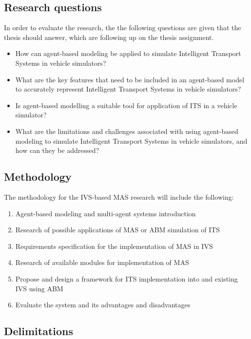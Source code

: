 \documentclass[titlepage, 12pt]{article}
\begin{document}
\subsection{Research questions}

In order to evaluate the research, the the following questions are given that 
the thesis should answer, which are following up on the thesis assignment. 

\begin{itemize}
    \item How can agent-based modeling be applied to simulate Intelligent Transport Systems in vehicle simulators?
    \item What are the key features that need to be included in an agent-based model to accurately represent Intelligent Transport Systems in vehicle simulators?
    \item Is agent-based modelling a suitable tool for application of ITS in a vehicle simulator?
    \item What are the limitations and challenges associated with using agent-based modeling to simulate Intelligent Transport Systems in vehicle simulators, and how can they be addressed?
\end{itemize}

\subsection{Methodology}

The methodology for the IVS-based MAS research will include the following: 

\begin{enumerate}
    \item Agent-based modeling and multi-agent systems introduction
    \item Research of possible applications of MAS or ABM simulation of ITS
    \item Requirements specification for the implementation of MAS in IVS
    \item Research of available modules for implementation of MAS
    \item Propose and design a framework for ITS implementation into and existing IVS using ABM
    \item Evaluate the system and its advantages and disadvantages
\end{enumerate}

\subsection{Delimitations}
\end{document}
